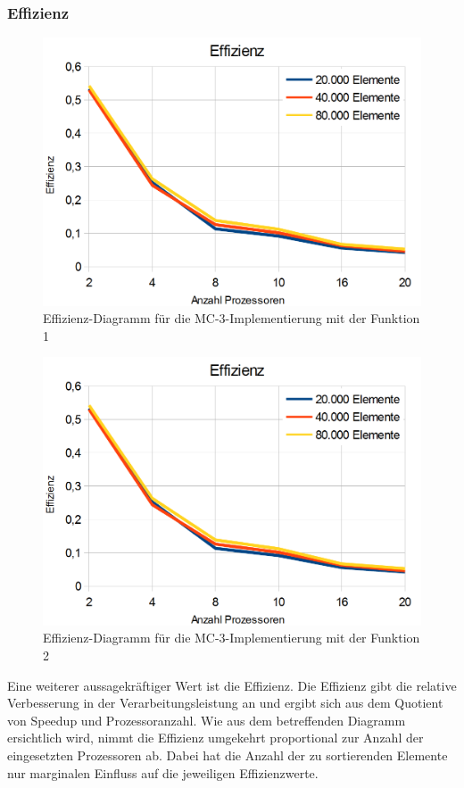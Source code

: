 \documentclass[a4paper,12pt]{scrartcl}
\begin{document}
\subsubsection{Effizienz}
\begin{figure}[htb]
  \begin{center}
    \includegraphics[width=1\hsize]{../effizienz.png}
  \end{center}
  \caption{\label{mpieffizienz}
    Effizienz-Diagramm f\"ur die MC-3-Implementierung mit der Funktion 1}
\end{figure}
\begin{figure}[htb]
  \begin{center}
    \includegraphics[width=1\hsize]{../effizienz.png}
  \end{center}
  \caption{\label{mpieffizienz}
    Effizienz-Diagramm f\"ur die MC-3-Implementierung mit der Funktion 2}
\end{figure}
Eine weiterer aussagekräftiger Wert ist die Effizienz.
Die Effizienz gibt die relative Verbesserung in der Verarbeitungsleistung an und ergibt sich aus dem Quotient von Speedup und Prozessoranzahl.
Wie aus dem betreffenden Diagramm ersichtlich wird, nimmt die Effizienz umgekehrt proportional zur Anzahl der eingesetzten
Prozessoren ab. Dabei hat die Anzahl der zu sortierenden Elemente nur marginalen Einfluss auf die jeweiligen Effizienzwerte.
\end{document}
